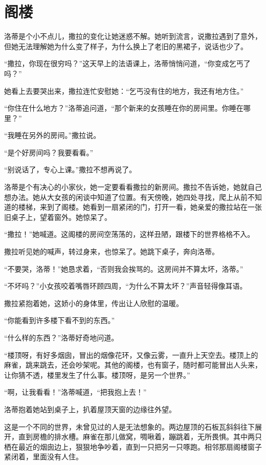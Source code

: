 \documentclass[12pt,UTF-8,openany]{ctexbook}
\begin{document}
\chapter{阁楼}

\begin{Large}
    
    洛蒂是个小不点儿，撒拉的变化让她迷惑不解。她听到流言，说撒拉遇到了意外，但她无法理解她为什么变了样子，为什么换上了老旧的黑裙子，说话也少了。
    
    “撒拉，你现在很穷吗？”这天早上的法语课上，洛蒂悄悄问道，“你变成乞丐了吗？”
    
    她看上去要哭出来，撒拉连忙安慰她：“乞丐没有住的地方，我还有地方住。”
    
    “你住在什么地方？”洛蒂追问道，“那个新来的女孩睡在你的房间里。你睡在哪里？”
    
    “我睡在另外的房间。”撒拉说。
    
    “是个好房间吗？我要看看。”
    
    “别说话了，专心上课。”撒拉不想再说了。
    
    洛蒂是个有决心的小家伙，她一定要看看撒拉的新房间。撒拉不告诉她，她就自己想办法。她从大女孩的闲谈中知道了位置。有天傍晚，她四处寻找，爬上从前不知道的楼梯，来到了阁楼。她看到一扇紧闭的门，打开一看，她亲爱的撒拉站在一张旧桌子上，望着窗外。她惊呆了。
    
    “撒拉！”她喊道。这阁楼的房间空荡荡的，这样丑陋，跟楼下的世界格格不入。
    
    撒拉听见她的喊声，转过身来，也惊呆了。她跳下桌子，奔向洛蒂。
    
    “不要哭，洛蒂！”她恳求着，“否则我会挨骂的。这房间并不算太坏，洛蒂。”
    
    “不坏吗？”小女孩咬着嘴唇环顾四周，“为什么不算太坏？”声音轻得像耳语。
    
    撒拉紧抱着她，这娇小的身体里，传出让人欣慰的温暖。
    
    “你能看到许多楼下看不到的东西。”
    
    “什么样的东西？”洛蒂好奇地问道。
    
    “楼顶呀，有好多烟囱，冒出的烟像花环，又像云雾，一直升上天空去。楼顶上的麻雀，跳来跳去，还会吵架呢。其他的阁楼，也有窗子，随时都可能冒出人头来，让你猜不透，楼里发生了什么事。楼顶呀，是另一个世界。”
    
    “啊，让我看看！”洛蒂喊道，“把我抱上去！”
    
    洛蒂抱着她站到桌子上，扒着屋顶天窗的边缘往外望。
    
    这是一个不同的世界，未曾见过的人是无法想象的。两边屋顶的石板瓦斜斜往下展开，直到房檐的排水槽。麻雀在那儿做窝，啁啾着，蹦跳着，无所畏惧。其中两只栖在最近的烟囱边上，狠狠地争吵着，直到一只把另一只啄跑。相邻那扇阁楼窗子紧闭着，里面没有人住。
    

\end{Large}
\end{document}
